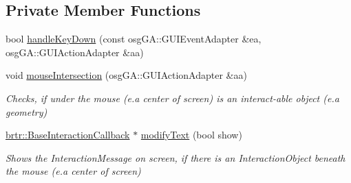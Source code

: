 \subsection*{Private Member Functions}
\begin{DoxyCompactItemize}
\item 
bool \hyperlink{classbrtr_1_1_key_handler_a5af6a6e66e8754591b3425addc6e6858}{handle\+Key\+Down} (const osg\+G\+A\+::\+G\+U\+I\+Event\+Adapter \&ea, osg\+G\+A\+::\+G\+U\+I\+Action\+Adapter \&aa)
\item 
void \hyperlink{classbrtr_1_1_key_handler_a7f402d48b863ed19ef47038a32d1d05c}{mouse\+Intersection} (osg\+G\+A\+::\+G\+U\+I\+Action\+Adapter \&aa)
\begin{DoxyCompactList}\small\item\em Checks, if under the mouse (e.\+a center of screen) is an interact-\/able object (e.\+a geometry) \end{DoxyCompactList}\item 
\hyperlink{classbrtr_1_1_base_interaction_callback}{brtr\+::\+Base\+Interaction\+Callback} $\ast$ \hyperlink{classbrtr_1_1_key_handler_a1925fa114839192716167477714abfdc}{modify\+Text} (bool show)
\begin{DoxyCompactList}\small\item\em Shows the Interaction\+Message on screen, if there is an Interaction\+Object beneath the mouse (e.\+a center of screen) \end{DoxyCompactList}\end{DoxyCompactItemize}
